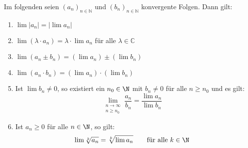 Im folgenden seien $(a_n)_{n \in \mathbb{N}}$ und $(b_n)_{n \in \mathbb{N}}$ konvergente Folgen. Dann gilt:
\begin{enumerate}[label=(\arabic*)]
    \item $\lim |a_n| = |\lim a_n|$
    \item $\lim (\lambda \cdot a_n) = \lambda \cdot \lim a_n$ \qquad für alle $\lambda \in \mathbb{C}$
    \item $\lim(a_n \pm b_n) = (\lim a_n) \pm (\lim b_n)$
    \item $\lim(a_n \cdot b_n) = (\lim a_n) \cdot (\lim b_n)$
    \item Ist $\lim b_n \neq 0$, so existiert ein $n_0 \in \N$ mit $b_n \neq 0$ für alle $n \geq n_0$ und es gilt:
    $$\lim_{\substack{n \to \infty \\ n \geq n_0}} \frac{a_n}{b_n} = \frac{\lim a_n}{\lim b_n}$$
    \item Ist $a_n \geq 0$ für alle $n \in \N$, so gilt:
    $$\lim \sqrt[k]{a_n} = \sqrt[k]{\lim a_n} \qquad \text{für alle $k \in \N$}$$
\end{enumerate}